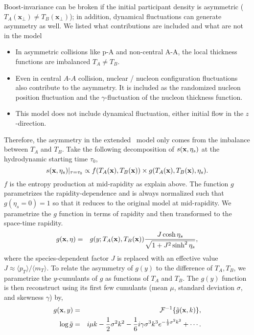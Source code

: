 Boost-invariance can be broken if the initial participant density is asymmetric ($T_A(\mathbf{x}_\perp) \neq T_B(\mathbf{x}_\perp)$); in addition, dynamical fluctuations can generate asymmetry as well.
We listed what contributions are included and what are not in the model
\begin{itemize}
\item In asymmetric collisions like p-A and non-central A-A, the local thickness functions are imbalanced $T_A \neq T_B$.
\item Even in central $A$-$A$ collision, nuclear / nucleon configuration fluctuations also contribute to the asymmetry. It is included as the randomized nucleon position fluctuation and the $\gamma$-fluctuation of the nucleon thickness function.
\item This model does not include dynamical fluctuation, either initial flow in the $z$-direction.
\end{itemize}
Therefore, the asymmetry in the extended \trento\ model only comes from the imbalance between $T_A$ and $T_B$.
Take the following decomposition of $s(\mathbf x, \eta_s)$ at the hydrodynamic starting time $\tau_0$,
\begin{equation}
  s(\mathbf x, \eta_s)\vert_{\tau=\tau_0} \propto f(T_A(\mathbf x), T_B(\mathbf x)) \times g(T_A(\mathbf x), T_B(\mathbf x), \eta_s).
  \label{factorized}
\end{equation}
$f$ is the entropy production at mid-rapidity as explain above.
The function $g$ parametrizes the rapidity-dependence and is always normalized such that $g(\eta_s=0)=1$ so that it reduces to the original model at mid-rapidity.
We parametrize the $g$ function in terms of rapidity and then transformed to the space-time rapidity.
\begin{eqnarray}
g(\mathbf x, \eta) &=& g(y; T_A(\mathbf x), T_B(\mathbf x)) \frac{J \cosh \eta_s}{\sqrt{1 + J^2 \sinh^2 \eta_s}},
\label{jacobian}
\end{eqnarray}
where the species-dependent factor $J$ is replaced with an effective value $J \approx \langle p_T \rangle / \langle m_T \rangle$.
To relate the asymmetry of $g(y)$ to the difference of $T_A, T_B$, we parametrize the $y$-cumulants of $g$ as functions of $T_A$ and $T_B$.
The $g(y)$ function is then reconstruct using its first few cumulants (mean $\mu$, standard deviation $\sigma$, and skewness $\gamma$) by,
\begin{eqnarray}
g(\x, y) &=& \mathcal{F}^{-1}\{\tilde{g}(\x, k)\}, \\
\log \tilde{g} &=&  i \mu k - \frac{1}{2}\sigma^2 k^2 - \frac{1}{6} i \gamma \sigma^3 k^3  e^{-\frac{1}{2}\sigma^2 k^2} + \cdots \label{eq:cgf}.
\end{eqnarray}
